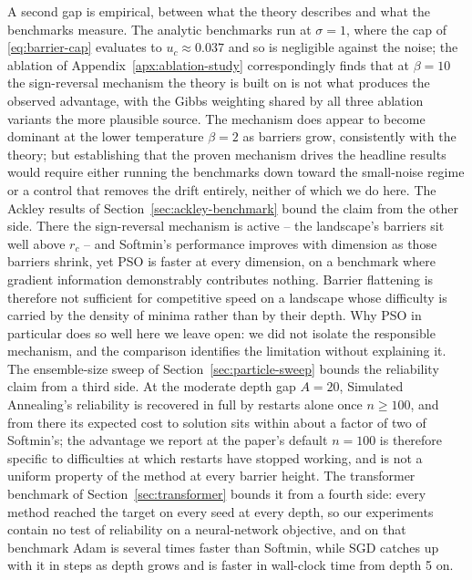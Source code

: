 \documentclass{article}
\theoremstyle{plain}
\theoremstyle{definition}
\theoremstyle{remark}
\begin{document}
A second gap is empirical, between what the theory describes and what the benchmarks measure. The analytic benchmarks run at $\sigma=1$, where the cap of \eqref{eq:barrier-cap} evaluates to $u_c\approx0.037$ and so is negligible against the noise; the ablation of Appendix~\ref{apx:ablation-study} correspondingly finds that at $\beta=10$ the sign-reversal mechanism the theory is built on is not what produces the observed advantage, with the Gibbs weighting shared by all three ablation variants the more plausible source. The mechanism does appear to become dominant at the lower temperature $\beta=2$ as barriers grow, consistently with the theory; but establishing that the proven mechanism drives the headline results would require either running the benchmarks down toward the small-noise regime or a control that removes the drift entirely, neither of which we do here. The Ackley results of Section~\ref{sec:ackley-benchmark} bound the claim from the other side. There the sign-reversal mechanism is active -- the landscape's barriers sit well above $r_c$ -- and Softmin's performance improves with dimension as those barriers shrink, yet PSO is faster at every dimension, on a benchmark where gradient information demonstrably contributes nothing. Barrier flattening is therefore not sufficient for competitive speed on a landscape whose difficulty is carried by the density of minima rather than by their depth. Why PSO in particular does so well here we leave open: we did not isolate the responsible mechanism, and the comparison identifies the limitation without explaining it. The ensemble-size sweep of Section~\ref{sec:particle-sweep} bounds the reliability claim from a third side. At the moderate depth gap $A=20$, Simulated Annealing's reliability is recovered in full by restarts alone once $n\geq100$, and from there its expected cost to solution sits within about a factor of two of Softmin's; the advantage we report at the paper's default $n=100$ is therefore specific to difficulties at which restarts have stopped working, and is not a uniform property of the method at every barrier height. The transformer benchmark of Section~\ref{sec:transformer} bounds it from a fourth side: every method reached the target on every seed at every depth, so our experiments contain no test of reliability on a neural-network objective, and on that benchmark Adam is several times faster than Softmin, while SGD catches up with it in steps as depth grows and is faster in wall-clock time from depth 5 on.
\end{document}
